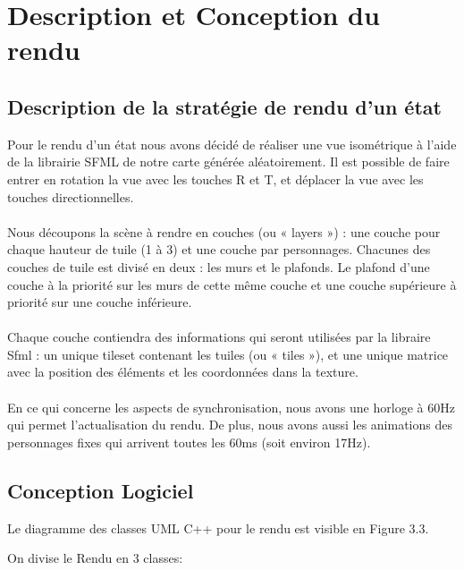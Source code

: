 \chapter{Description et Conception du rendu}


\section{Description de la stratégie de rendu d’un état}

Pour le rendu d'un état nous avons décidé de réaliser une vue isométrique 
à l'aide de la librairie SFML de notre carte générée
aléatoirement. Il est possible de faire entrer en rotation la vue avec les
touches R et T, et déplacer la vue avec les touches directionnelles. 
\\
\\Nous découpons la scène à rendre en couches (ou « layers ») : une couche 
pour chaque hauteur de tuile (1 à 3) et une couche par personnages.
Chacunes des couches de tuile est divisé en deux : les murs et le
plafonds. Le plafond d'une couche à la priorité sur les murs de
cette même couche et une couche supérieure à priorité sur une
couche inférieure.
\\
\\Chaque couche contiendra des informations qui seront utilisées
par la libraire Sfml : un unique tileset contenant les tuiles 
(ou « tiles »), et une unique matrice avec 
la position des éléments et les coordonnées dans la texture.
\\
\\En ce qui concerne les aspects de synchronisation, nous avons 
une horloge à 60Hz qui permet l'actualisation du rendu. 
De plus, nous avons aussi les animations des personnages 
fixes qui arrivent toutes les 60ms (soit environ 17Hz).

\section{Conception Logiciel}

Le diagramme des classes UML C++ pour le rendu est visible en Figure 3.3.

On divise le Rendu en 3 classes:

